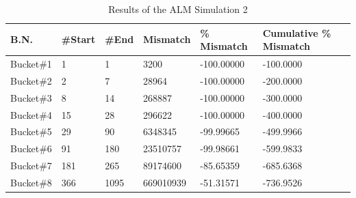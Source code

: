 \begin{table}[h!]
 \caption{Results of the ALM Simulation 2}
    \label{tab:Results of the ALM Simulation 2}
\begin{tabular}{llllll}
\hline
\multicolumn{1}{|l|}{B.N.}         & \multicolumn{1}{l|}{\#Start}   & \multicolumn{1}{l|}{\#End}   & \multicolumn{1}{l|}{Mismatch}     & \multicolumn{1}{l|}{\% Mismatch}   & \multicolumn{1}{l|}{Cumulative \% Mismatch}  \\ \hline
\multicolumn{1}{|l|}{Bucket\#1}    & \multicolumn{1}{l|}{1}         & \multicolumn{1}{l|}{1}       & \multicolumn{1}{l|}{3200}         & \multicolumn{1}{l|}{-100.00000}    & \multicolumn{1}{l|}{-100.0000}               \\ \hline
\multicolumn{1}{|l|}{Bucket\#2}    & \multicolumn{1}{l|}{2}         & \multicolumn{1}{l|}{7}       & \multicolumn{1}{l|}{28964}        & \multicolumn{1}{l|}{-100.00000}    & \multicolumn{1}{l|}{-200.0000}               \\ \hline
\multicolumn{1}{|l|}{Bucket\#3}    & \multicolumn{1}{l|}{8}         & \multicolumn{1}{l|}{14}      & \multicolumn{1}{l|}{268887}       & \multicolumn{1}{l|}{-100.00000}    & \multicolumn{1}{l|}{-300.0000}               \\ \hline
\multicolumn{1}{|l|}{Bucket\#4}    & \multicolumn{1}{l|}{15}        & \multicolumn{1}{l|}{28}      & \multicolumn{1}{l|}{296622}       & \multicolumn{1}{l|}{-100.00000}    & \multicolumn{1}{l|}{-400.0000}               \\ \hline
\multicolumn{1}{|l|}{Bucket\#5}    & \multicolumn{1}{l|}{29}        & \multicolumn{1}{l|}{90}      & \multicolumn{1}{l|}{6348345}      & \multicolumn{1}{l|}{-99.99665}     & \multicolumn{1}{l|}{-499.9966}               \\ \hline
\multicolumn{1}{|l|}{Bucket\#6}    & \multicolumn{1}{l|}{91}        & \multicolumn{1}{l|}{180}     & \multicolumn{1}{l|}{23510757}     & \multicolumn{1}{l|}{-99.98661}     & \multicolumn{1}{l|}{-599.9833}               \\ \hline
\multicolumn{1}{|l|}{Bucket\#7}    & \multicolumn{1}{l|}{181}       & \multicolumn{1}{l|}{265}     & \multicolumn{1}{l|}{89174600}     & \multicolumn{1}{l|}{-85.65359}     & \multicolumn{1}{l|}{-685.6368}               \\ \hline
\multicolumn{1}{|l|}{Bucket\#8}    & \multicolumn{1}{l|}{366}       & \multicolumn{1}{l|}{1095}    & \multicolumn{1}{l|}{669010939}    & \multicolumn{1}{l|}{-51.31571}     & \multicolumn{1}{l|}{-736.9526}               \\ \hline

\end{tabular}
\end{table}
